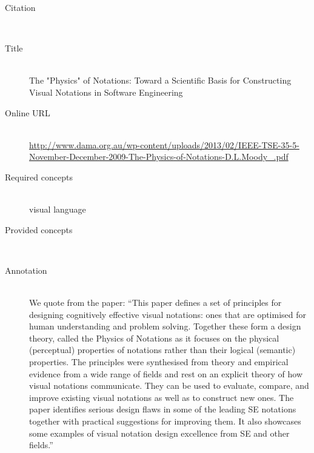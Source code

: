 \begin{description}
\item[Citation]\mbox{}\\
\cite{Moody09}
\item[Title]\mbox{}\\
The "Physics" of Notations: Toward a Scientific Basis for Constructing Visual Notations in Software Engineering
\item[Online URL]\mbox{}\\
{\footnotesize\url{http://www.dama.org.au/wp-content/uploads/2013/02/IEEE-TSE-35-5-November-December-2009-The-Physics-of-Notations-D.L.Moody_.pdf}}
\item[Required concepts]\mbox{}\\
visual language\item[Provided concepts]\mbox{}\\
\item[Annotation]\mbox{}\\
We quote from the paper: ``This paper defines a set of principles for designing cognitively effective visual notations: ones that are optimised for human understanding and problem solving. Together these form a design theory, called the Physics of Notations as it focuses on the physical (perceptual) properties of notations rather than their logical (semantic) properties. The principles were synthesised from theory and empirical evidence from a wide range of fields and rest on an explicit theory of how visual notations communicate. They can be used to evaluate, compare, and improve existing visual notations as well as to construct new ones. The paper identifies serious design flaws in some of the leading SE notations together with practical suggestions for improving them. It also showcases some examples of visual notation design excellence from SE and other fields.''
\end{description}

